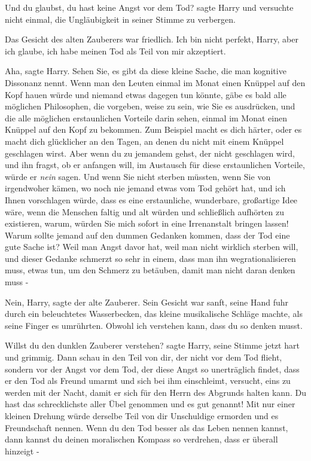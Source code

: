 \glqq{}Und du glaubst, du hast keine Angst vor dem Tod?\grqq{} sagte Harry und
versuchte nicht einmal, die Ungläubigkeit in seiner Stimme zu verbergen.

Das Gesicht des alten Zauberers war friedlich. \glqq{}Ich bin nicht perfekt,
Harry, aber ich glaube, ich habe meinen Tod als Teil von mir akzeptiert.\grqq{}

\glqq{}Aha\grqq{}, sagte Harry. \glqq{}Sehen Sie, es gibt da diese kleine Sache,
die man kognitive Dissonanz nennt. Wenn man den Leuten einmal im Monat einen
Knüppel auf den Kopf hauen würde und niemand etwas dagegen tun könnte, gäbe es
bald alle möglichen Philosophen, die vorgeben, weise zu sein, wie Sie es
ausdrücken, und die alle möglichen erstaunlichen Vorteile darin sehen, einmal im
Monat einen Knüppel auf den Kopf zu bekommen. Zum Beispiel macht es dich härter,
oder es macht dich glücklicher an den Tagen, an denen du nicht mit einem Knüppel
geschlagen wirst. Aber wenn du zu jemandem gehst, der nicht geschlagen wird, und
ihn fragst, ob er anfangen will, im Austausch für diese erstaunlichen Vorteile,
würde er \emph{nein} sagen. Und wenn Sie nicht sterben müssten, wenn Sie von
irgendwoher kämen, wo noch nie jemand etwas vom Tod gehört hat, und ich Ihnen
vorschlagen würde, dass es eine erstaunliche, wunderbare, großartige Idee wäre,
wenn die Menschen faltig und alt würden und schließlich aufhörten zu existieren,
warum, würden Sie mich sofort in eine Irrenanstalt bringen lassen! Warum sollte
jemand auf den dummen Gedanken kommen, dass der Tod eine gute Sache ist? Weil
man Angst davor hat, weil man nicht wirklich sterben will, und dieser Gedanke
schmerzt so sehr in einem, dass man ihn wegrationalisieren muss, etwas tun, um
den Schmerz zu betäuben, damit man nicht daran denken muss -\grqq{}

\glqq{}Nein, Harry\grqq{}, sagte der alte Zauberer. Sein Gesicht war sanft, seine
Hand fuhr durch ein beleuchtetes Wasserbecken, das kleine musikalische Schläge
machte, als seine Finger es umrührten. \glqq{}Obwohl ich verstehen kann, dass du
so denken musst.\grqq{}

\glqq{}Willst du den dunklen Zauberer verstehen?\grqq{} sagte Harry, seine Stimme
jetzt hart und grimmig. \glqq{}Dann schau in den Teil von dir, der nicht vor dem
Tod flieht, sondern vor der Angst vor dem Tod, der diese Angst so unerträglich
findet, dass er den Tod als Freund umarmt und sich bei ihm einschleimt,
versucht, eins zu werden mit der Nacht, damit er sich für den Herrn des Abgrunds
halten kann. Du hast das schrecklichste aller Übel genommen und es gut genannt!
Mit nur einer kleinen Drehung würde derselbe Teil von dir Unschuldige ermorden
und es Freundschaft nennen. Wenn du den Tod besser als das Leben nennen kannst,
dann kannst du deinen moralischen Kompass so verdrehen, dass er überall hinzeigt
-\grqq{}

